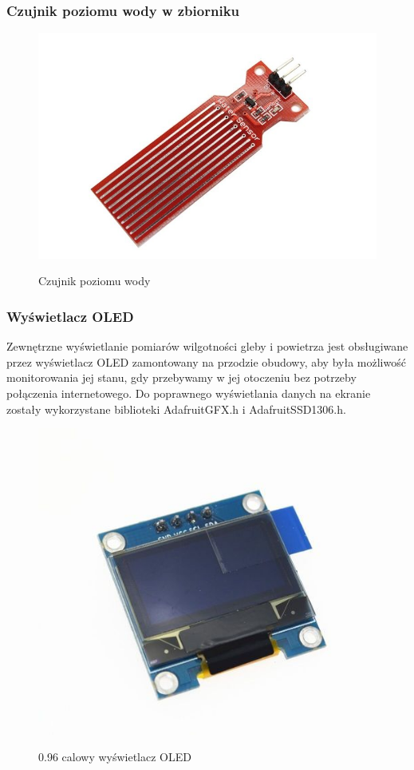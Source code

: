 \documentclass[12pt]{article}
\begin{document}
\subsubsection{Czujnik poziomu wody w zbiorniku}

\begin{figure}[!h]
	\begin{center}
		{\includegraphics[width=12cm]{water_sensor_photo.png}}
	\end{center}
	\caption{Czujnik poziomu wody}
\end{figure}

\subsubsection{Wyświetlacz OLED}
Zewnętrzne wyświetlanie pomiarów wilgotności gleby i powietrza jest obsługiwane przez wyświetlacz OLED zamontowany na przodzie obudowy, aby była możliwość monitorowania jej stanu, gdy przebywamy w jej otoczeniu bez potrzeby połączenia internetowego. Do poprawnego wyświetlania danych na ekranie zostały wykorzystane biblioteki AdafruitGFX.h i AdafruitSSD1306.h.
\begin{figure}[!h]
	\begin{center}
		{\includegraphics[width=12cm]{oled-display_photo.png}}
	\end{center}
	\caption{0.96 calowy wyświetlacz OLED}
\end{figure}
\end{document}

